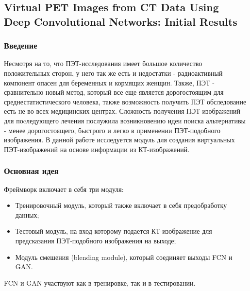 \subsection*{Virtual PET Images from CT Data Using Deep
Convolutional Networks: Initial Results}

\subsubsection*{Введение}
Несмотря на то, что ПЭТ-исследования имеет большое количество положительных 
сторон, у него так же есть и недостатки - радиоактивный компонент опасен 
для беременных и кормящих женщин. Также, ПЭТ - сравнительно новый метод, который все 
еще является дорогостоящим для среднестатистического человека, также возможность получить 
ПЭТ обследование есть не во всех медицинских центрах. Сложность получения ПЭТ-изображений для 
поcледующего лечения послужила возникновению идеи поиска альтернативы - менее дорогостоящего, быстрого 
и легко в применении ПЭТ-подобного изображения. В данной работе \cite{ann10} исследуется 
модуль для создания виртуальных ПЭТ-изображений на основе информации из КТ-изображений.
\subsubsection*{Основная идея}
Фреймворк включает в себя три модуля:
\begin{itemize}
    \item Тренировочный модуль, который также включает в себя предобработку данных;
    \item Тестовый модуль, на вход которому подается КТ-изображение для предсказания 
    ПЭТ-подобного изображения на выходе;
    \item Модуль смешения (blending module), который соединяет выходы FCN и GAN.
\end{itemize}
FCN и GAN участвуют как в тренировке, так и в тестировании.

